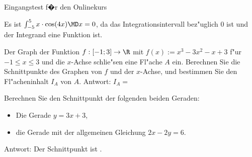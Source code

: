 \begin{MTest}{Eingangstest f�r den Onlinekurs}
\begin{MExercise} %
Es ist $\int_{-5}^{5} x \cdot \cos(4 x) \MD x = 0$, da das Integrationsintervall
 bez"uglich $0$ ist und der Integrand eine 
 Funktion ist.

\end{MExercise}


\begin{MExercise} %
Der Graph der Funktion $f: [-1; 3] \rightarrow \R$ mit 
$f(x) := x^3 - 3 x^2 - x + 3$ 
f"ur $-1 \leq x \leq 3$ und die $x$-Achse schlie"sen eine Fl"ache $A$ ein.
Berechnen Sie die Schnittpunkte des Graphen von $f$ und der $x$-Achse, und
bestimmen Sie den Fl"acheninhalt $I_A$ von $A$.
%
Antwort: $I_A = $
\end{MExercise}

\begin{MExercise}
Berechnen Sie den Schnittpunkt der folgenden beiden Geraden:
\begin{itemize}
\item{Die Gerade $y=3x+3$,}
\item{die Gerade mit der allgemeinen Gleichung $2x-2y=6$.}
\end{itemize}

Antwort: Der Schnittpunkt ist .\\
\end{MExercise}



\end{MTest}
